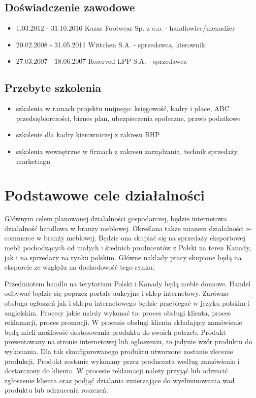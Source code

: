 	\subsection{Doświadczenie zawodowe}
		\begin{itemize}
			\item 1.03.2012 - 31.10.2016 Kazar Footwear Sp. z o.o. - handlowiec/menadżer
			\item 20.02.2008 - 31.05.2011 Wittchen S.A. - sprzedawca, kierownik
			\item 27.03.2007 - 18.06.2007 Reserved LPP S.A. - sprzedawca  
		\end{itemize}	
		
	\subsection{Przebyte szkolenia}
		\begin{itemize}
			\item szkolenia w ramach projektu unijnego: księgowość, kadry i płace, ABC przedsiębiorczości, biznes plan,  ubezpieczenia społeczne, prawo podatkowe
			\item szkolenie dla kadry kierowniczej z zakresu BHP
			\item szkolenia wewnętrzne w firmach z zakresu zarządzania, technik sprzedaży, marketingu
		\end{itemize}
		
	\section{Podstawowe cele działalności}
		\par Głównym celem planowanej działalności gospodarczej, będzie internetowa działalność handlowa w branży meblowej. Określana także mianem działalności e-commerce w branży meblowej. Będzie ona skupiać się na sprzedaży eksportowej mebli pochodzących od małych i średnich producentów z Polski na teren Kanady, jak i na sprzedaży na rynku polskim. Główne nakłady pracy skupione będą na eksporcie ze względu na dochodowość tego rynku.
			
		\par Przedmiotem handlu na terytorium Polski i Kanady będą meble domowe. Handel odbywać będzie się poprzez portale aukcyjne i sklep internetowy. Zarówno obsługa ogłoszeń jak i sklepu internetowego będzie przebiegać w języku polskim i angielskim. Procesy jakie należy wykonać to: proces obsługi klienta, proces reklamacji, proces promocji. W procesie obsługi klienta składający zamówienie będą mieli możliwość dostosowania produktu do swoich potrzeb. Produkt prezentowany na stronie internetowej lub ogłoszeniu, to jedynie wzór produktu do wykonania. Dla tak skonfigurowanego produktu utworzone zostanie zlecenie produkcji. Produkt zostanie wykonany przez producenta według zamówienia i dostarczony do klienta. W procesie reklamacji należy przyjąć lub odrzucić zgłoszenie klienta oraz podjąć działania zmierzające do wyeliminowania wad produktu lub odrzucenia roszczeń. 
			
